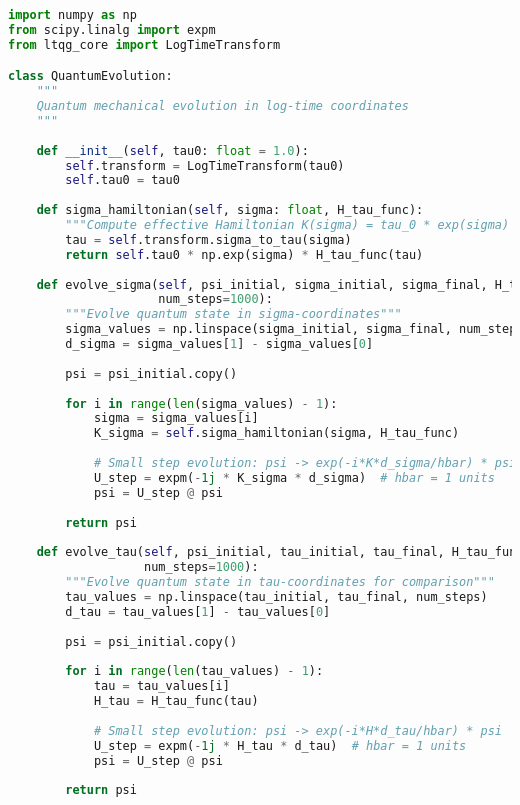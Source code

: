 \documentclass[11pt,a4paper]{article}
\begin{document}
\begin{lstlisting}[language=Python, caption=Quantum Evolution in Log-Time]
import numpy as np
from scipy.linalg import expm
from ltqg_core import LogTimeTransform

class QuantumEvolution:
    """
    Quantum mechanical evolution in log-time coordinates
    """
    
    def __init__(self, tau0: float = 1.0):
        self.transform = LogTimeTransform(tau0)
        self.tau0 = tau0
    
    def sigma_hamiltonian(self, sigma: float, H_tau_func):
        """Compute effective Hamiltonian K(sigma) = tau_0 * exp(sigma) * H(tau)"""
        tau = self.transform.sigma_to_tau(sigma)
        return self.tau0 * np.exp(sigma) * H_tau_func(tau)
    
    def evolve_sigma(self, psi_initial, sigma_initial, sigma_final, H_tau_func, 
                     num_steps=1000):
        """Evolve quantum state in sigma-coordinates"""
        sigma_values = np.linspace(sigma_initial, sigma_final, num_steps)
        d_sigma = sigma_values[1] - sigma_values[0]
        
        psi = psi_initial.copy()
        
        for i in range(len(sigma_values) - 1):
            sigma = sigma_values[i]
            K_sigma = self.sigma_hamiltonian(sigma, H_tau_func)
            
            # Small step evolution: psi -> exp(-i*K*d_sigma/hbar) * psi
            U_step = expm(-1j * K_sigma * d_sigma)  # hbar = 1 units
            psi = U_step @ psi
            
        return psi
    
    def evolve_tau(self, psi_initial, tau_initial, tau_final, H_tau_func, 
                   num_steps=1000):
        """Evolve quantum state in tau-coordinates for comparison"""
        tau_values = np.linspace(tau_initial, tau_final, num_steps)
        d_tau = tau_values[1] - tau_values[0]
        
        psi = psi_initial.copy()
        
        for i in range(len(tau_values) - 1):
            tau = tau_values[i]
            H_tau = H_tau_func(tau)
            
            # Small step evolution: psi -> exp(-i*H*d_tau/hbar) * psi
            U_step = expm(-1j * H_tau * d_tau)  # hbar = 1 units
            psi = U_step @ psi
            
        return psi
\end{lstlisting}
\end{document}
